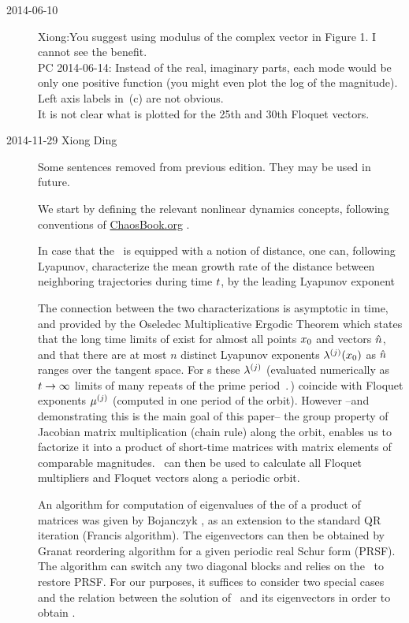 \begin{description}
\item[2014-06-10]
    Xiong:You suggest using modulus of the complex vector in Figure 1. I
    cannot see the benefit.
        \\
    PC 2014-06-14: Instead of the real, imaginary parts, each mode would be
    only one positive function (you might even plot the log of the
    magnitude).
        \\
    Left axis labels in \,(c) are not obvious.
        \\
    It is not clear what is plotted for the 25th and 30th Floquet
    vectors.

\item[2014-11-29 Xiong Ding] Some sentences removed from previous
edition. They may be used in future.

We start by
defining the relevant nonlinear dynamics concepts, following conventions
of \href{http://ChaosBook.org}{ChaosBook.org}  .


In case that the \statesp\ is equipped with a notion of
distance, one can, following Lyapunov, characterize the mean
growth rate of the distance between neighboring trajectories during time
$t$, by the leading {Lyapunov exponent}

The connection between the two characterizations is asymptotic in time,
and provided by the Oseledec Multiplicative Ergodic Theorem
which states that the long time limits  of  exist
for almost all points ${x_0}$ and vectors $\hat{n}$, and that there are
at most $n$ distinct Lyapunov exponents $\eigExp[j](\xInit)$ as
$\hat{n}$ ranges over the tangent space. For \po s these $\eigExp[j]$
(evaluated numerically as $t\to\infty$ limits of many repeats of the
prime period $\period{}$) coincide with Floquet exponents $\eigRe[j]$
(computed in one period of the orbit).
However --and demonstrating this is the main
goal of this paper-- the group property of Jacobian matrix multiplication
(chain rule) along the orbit,
enables us to factorize it into a product of short-time matrices with
matrix elements of comparable magnitudes. \Ped\ can then be used to
calculate all Floquet multipliers and Floquet vectors along a periodic
orbit.

An algorithm for computation of eigenvalues of the {\em \psd} of a
product of matrices was given by Bojanczyk
\etal{}, as an extension to the standard QR
iteration (Francis algorithm). The eigenvectors can then be
obtained by Granat  \etal{} reordering algorithm for a given
periodic real Schur form (PRSF). The algorithm can switch any two
diagonal blocks and relies on the \pqr\ to restore PRSF. For our
purposes, it suffices to consider two special cases and the relation
between the solution of \pse\ and its eigenvectors in order to obtain
\ped.


\end{description}
